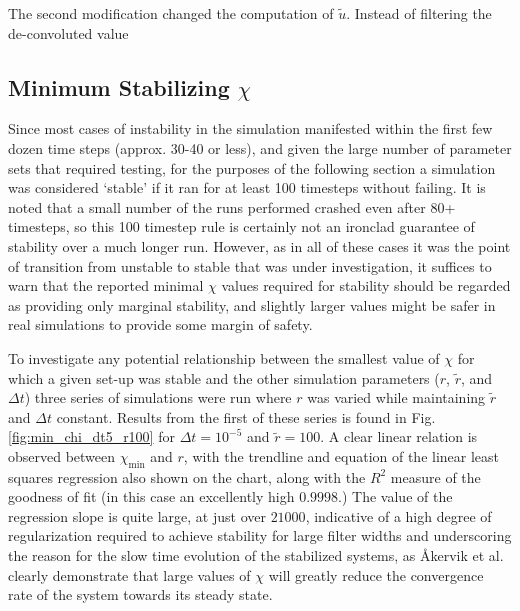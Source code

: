 The second modification changed the computation of $\tilde{u}$. Instead of filtering the de-convoluted value 

\subsection{Minimum Stabilizing $\chi$}

Since most cases of instability in the simulation manifested within the first few dozen time steps (approx. 30-40 or less), and given the large number of parameter sets that required testing, for the purposes of the following section a simulation was considered `stable' if it ran for at least 100 timesteps without failing. It is noted that a small number of the runs performed crashed even after 80+ timesteps, so this 100 timestep rule is certainly not an ironclad guarantee of stability over a much longer run. However, as in all of these cases it was the point of transition from unstable to stable that was under investigation, it suffices to warn that the reported minimal $\chi$ values required for stability should be regarded as providing only marginal stability, and slightly larger values might be safer in real simulations to provide some margin of safety.

To investigate any potential relationship between the smallest value of $\chi$ for which a given set-up was stable and the other simulation parameters ($r$, $\tilde{r}$, and $\Delta t$) three series of simulations were run where $r$ was varied while maintaining $\tilde{r}$ and $\Delta t$ constant. Results from the first of these series is found in Fig. \ref{fig:min_chi_dt5_r100} for $\Delta t=10^{-5}$ and $\tilde{r}=100$. A clear linear relation is observed between $\chi_{\mathrm{min}}$ and $r$, with the trendline and equation of the linear least squares regression also shown on the chart, along with the $R^2$ measure of the goodness of fit (in this case an excellently high $0.9998$.) The value of the regression slope is quite large, at just over $21000$, indicative of a high degree of regularization required to achieve stability for large filter widths and underscoring the reason for the slow time evolution of the stabilized systems, as \AA kervik et al. \cite{Akervik2006} clearly demonstrate that large values of $\chi$ will greatly reduce the convergence rate of the system towards its steady state.

